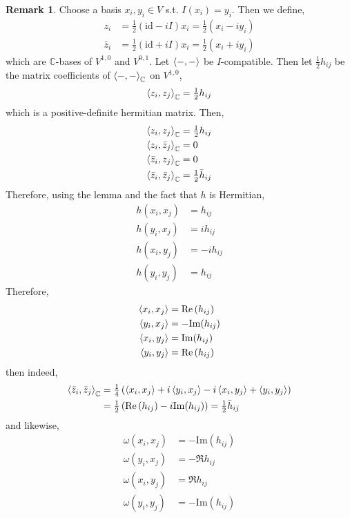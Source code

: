 \documentclass[12pt]{extarticle}
\newcommand{\C}{\mathbb{C}}
\newcommand{\id}{\mathrm{id}}
\renewcommand{\Im}[1]{\mathrm{Im}(#1)}
\theoremstyle{definition}
\newtheorem{remark}{Remark}
\begin{document}
\begin{remark}
Choose a basis $x_i, y_i \in V$ s.t. $I(x_i) = y_i$. Then we define,
\begin{align*}
z_i & = \tfrac{1}{2}(\id - i I) x_i = \tfrac{1}{2}(x_i - i y_i)
\\
\bar{z}_i & = \tfrac{1}{2}(\id + i I) x_i = \tfrac{1}{2} (x_i + i y_i)
\end{align*}
which are $\C$-bases of $V^{1,0}$ and $V^{0,1}$. Let $\left< -, - \right>$ be $I$-compatible. Then let $\tfrac{1}{2} h_{ij}$ be the matrix coefficients of $\inner{-}{-}_\C$ on $V^{1,0}$,
\[ \inner{z_i}{z_j}_\C = \tfrac{1}{2} h_{ij} \]
which is a positive-definite hermitian matrix. Then,
\begin{align*}
\inner{z_i}{z_j}_\C & = \tfrac{1}{2} h_{ij}
\\
\inner{z_i}{\bar{z}_j}_\C & = 0
\\
\inner{\bar{z}_i}{z_j}_\C & = 0
\\
\inner{\bar{z}_i}{\bar{z}_j}_\C & = \tfrac{1}{2} \bar{h}_{ij}
\end{align*}  
Therefore, using the lemma and the fact that $h$ is Hermitian,
\begin{align*}
h(x_i, x_j) & = h_{ij} 
\\
h(y_i, x_j) & = i h_{ij}
\\
h(x_i, y_j) & = -i h_{ij}
\\
h(y_i, y_j) & = h_{ij}
\end{align*}
Therefore,
\begin{align*}
\inner{x_i}{x_j} & = \Re{h_{ij}}
\\
\inner{y_i}{x_j} & = - \Im{h_{ij}}
\\
\inner{x_i}{y_j} & = \Im{h_{ij}}
\\
\inner{y_i}{y_j} & = \Re{h_{ij}}
\end{align*}
then indeed,
\begin{align*}
\inner{\bar{z}_i}{\bar{z}_j}_\C & = \tfrac{1}{4} \left( \inner{x_i}{x_j} + i \inner{y_i}{x_j} - i \inner{x_i}{y_j} + \inner{y_i}{y_j} \right)
\\
& = \tfrac{1}{2} \left( \Re{h_{ij}} - i \Im{h_{ij}} \right) = \tfrac{1}{2} \bar{h}_{ij}
\end{align*}
and likewise,
\begin{align*}
\omega(x_i, x_j) & = -\Im{h_{ij}}
\\
\omega(y_i, x_j) & = - \Re{h_{ij}}
\\
\omega(x_i, y_j) & = \Re{h_{ij}}
\\
\omega(y_i, y_j) & = - \Im{h_{ij}}

\end{align*}
\end{remark}
\end{document}
